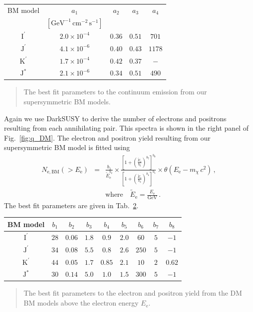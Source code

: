 \documentclass[10pt,aps,pra,reprint,amsmath,amsfonts,amssymb,showpacs,nofootinbib,floatfix]{revtex4-1}
\newcommand{\rmn}{\mathrm}
\newcommand{\ee}{E_\rmn{e}}
\newcommand{\Kp}{\rmn{K}^\prime}
\newcommand{\Ip}{\rmn{I}^\prime}
\newcommand{\Js}{\rmn{J}^*}
\newcommand{\Jp}{\rmn{J}^\prime}
\newcommand{\cm}{\rmn{cm}}
\newcommand{\eet}{\tilde{E}_\rmn{e}}
\newcommand{\gev}{\rmn{GeV}}
\newcommand{\e}{\rmn{e}}
\begin{document}
\begin{table}[h]
\begin{tabular}{c c c c c }
\hline
\hline
 BM model & $a_1$ & $a_2$  & $a_3$ & $a_4$ \\
          & $[\gev^{-1}\,\cm^{-2}\,\rmn{s}^{-1}]$ & & & \\
 \hline
$\Ip$ & $2.0\times10^{-4}$ & $0.36$ & $0.51$ & $701$  \\
$\Jp$ & $4.1\times10^{-6}$ & $0.40$ & $0.43$ & $1178$ \\
$\Kp$ & $1.7\times10^{-4}$ & $0.42$ & $0.37$ & $-$    \\
$\Js$ & $2.1\times10^{-6}$ & $0.34$ & $0.51$ & $490$  \\
\hline
\hline
\end{tabular}
\begin{quote}
The best fit parameters to the continuum emission from our
supersymmetric BM models.
 \label{tab:bm_cont}
  \end{quote}
\end{table} 

Again we use {\sc DarkSUSY} to derive the number of electrons and
positrons resulting from each annihilating pair. This spectra is shown
in the right panel of Fig.~\ref{fig:q_DM}. The electron and positron
yield resulting from our supersymmetric BM model is fitted using
\begin{eqnarray}
N_{\e,\rmn{BM}}(>\ee) &=& \frac{b_1}{\eet^{b_2}}\times
\frac{\left[1+\left(\frac{\eet}{b_6}\right)^{b_7}\right]^{b_8}}
{\left[1+\left(\frac{\eet}{b_3}\right)^{b_4}\right]^{b_5}}
\times\theta(\ee-m_\chi\,c^2)\,,\nonumber\\
& &\rmn{where}\quad\eet=\frac{\ee}{\gev}\,.
\label{eq:bm_elec}
\end{eqnarray}
The best fit parameters are given in Tab.~\ref{tab:bm_elec}.
\begin{table}[h]
\begin{tabular}{c c c c c c c c c}
\hline
\hline
 BM model & $b_1$ & $b_2$ & $b_3$ & $b_4$ & $b_5$ & $b_6$ & $b_7$ & $b_8$ \\
 \hline
$\Ip$ & $28$ & $0.06$ & $1.8$ & $0.9$  & $2.0$ & $60$  & $5$ & $-1$     \\
$\Jp$ & $34$ & $0.08$ & $5.5$ & $0.8$  & $2.6$ & $250$ & $5$ & $-1$     \\
$\Kp$ & $44$ & $0.05$ & $1.7$ & $0.85$ & $2.1$ & $10$  & $2$ & $0.62$   \\
$\Js$ & $30$ & $0.14$ & $5.0$ & $1.0$  & $1.5$ & $300$ & $5$ & $-1$     \\
\hline
\hline
\end{tabular}
\begin{quote}
The best fit parameters to the electron and positron yield from the DM
BM models above the electron energy $\ee$.
 \label{tab:bm_elec}
  \end{quote}
\end{table} 
\end{document}

